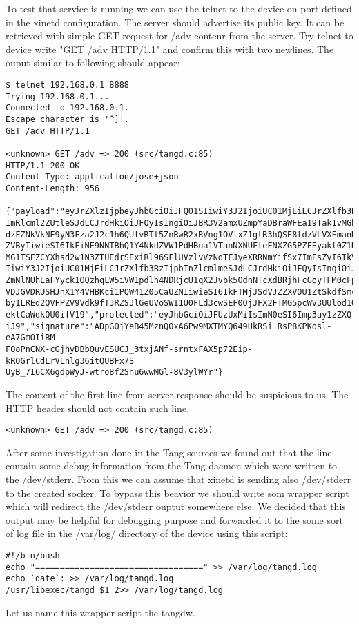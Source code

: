To test that service is running we can use the telnet to the device on port defined in the xinetd configuration.
The server should advertise its public key.
It can be retrieved with simple GET request for /adv contenr from the server.
Try telnet to device write "GET /adv HTTP/1.1" and confirm this with two newlines.
The ouput similar to following should appear:
\begin{lstlisting}[columns=fixed,basicstyle=\ttfamily\footnotesize,tabsize=4,backgroundcolor=\color{yellow!10}]
$ telnet 192.168.0.1 8888
Trying 192.168.0.1...
Connected to 192.168.0.1.
Escape character is '^]'.
GET /adv HTTP/1.1

<unknown> GET /adv => 200 (src/tangd.c:85)
HTTP/1.1 200 OK
Content-Type: application/jose+json
Content-Length: 956

{"payload":"eyJrZXlzIjpbeyJhbGciOiJFQ01SIiwiY3J2IjoiUC01MjEiLCJrZXlfb3BzIjpb
ImRlcml2ZUtleSJdLCJrdHkiOiJFQyIsIngiOiJBR3V2amxUZmpYaDBraWFEa19Tak1vMGhYUm1R
dzFZNkVkNE9yN3Fza2J2c1h6QUlvRTl5ZnRwR2xRVng1OVlxZ1gtR3hQSE8tdzVLVXFmanRGQkVV
ZVByIiwieSI6IkFiNE9NNTBhQ1Y4NkdZVW1PdHBua1VTanNXNUFleENXZG5PZFEyakl0Z1RGNXNq
MG1TSFZCYXhsd2w1N3ZTUEdrSExiRl96SFlUVzlvVzNoTFJyeXRRNmYifSx7ImFsZyI6IkVTNTEy
IiwiY3J2IjoiUC01MjEiLCJrZXlfb3BzIjpbInZlcmlmeSJdLCJrdHkiOiJFQyIsIngiOiJBQVpS
ZmNlNUhLaFYyck1OQzhqLW5iVW1pdlh4NDRjcU1qX2Jvbk5OdnNTcXdBRjhFcGoyTFM0cFpfdUNR
VDJGVDRUSHJnX1Y4VHBKci1PQW41Z05CaUZNIiwieSI6IkFTMjJSdVJZZXVOU1ZtSkdfSmcwSW1n
by1LREd2QVFPZV9Vdk9fT3RZS3lGeUVoSWI1U0FLd3cwSEF0QjJFX2FTMG5pcWV3UUlod1QyanR5
eklCaWdkQU0ifV19","protected":"eyJhbGciOiJFUzUxMiIsImN0eSI6Imp3ay1zZXQranNvb
iJ9","signature":"ADpGOjYeB45MznQOxA6Pw9MXTMYQ649UkRSi_RsP8KPKosl-eA7GmOIiBM
FOoPnCNX-cGjhyDBbQuvESUCJ_3txjANf-srntxFAX5p72Eip-kROGrlCdLrVLnlg36itQUBFx7S
UyB_7I6CX6gdpWyJ-wtro8f2Snu6wwMGl-8V3ylWYr"}
\end{lstlisting}
The content of the first line from server response should be suspicious to us.
The HTTP header should not contain such line\cite{RFC2616}.
\begin{lstlisting}[columns=fixed,basicstyle=\ttfamily\footnotesize,tabsize=4,backgroundcolor=\color{yellow!10}]
<unknown> GET /adv => 200 (src/tangd.c:85)
\end{lstlisting}
After some investigation done in the Tang sources we found out that the line contain some debug information from the Tang daemon which were written to the /dev/stderr.
From this we can assume that xinetd is sending also /dev/stderr to the created socker.
To bypass this beavior we should write som wrapper script which will redirect the /dev/stderr ouptut somewhere else.
We decided that this output may be helpful for debugging purpose and forwarded it to the some sort of log file in the /var/log/ directory of the device using this script:
\begin{lstlisting}[columns=fixed,basicstyle=\ttfamily\footnotesize,tabsize=4,backgroundcolor=\color{yellow!10}]
#!/bin/bash
echo "==================================" >> /var/log/tangd.log
echo `date`: >> /var/log/tangd.log
/usr/libexec/tangd $1 2>> /var/log/tangd.log
\end{lstlisting}
Let us name this wrapper script the tangdw.

